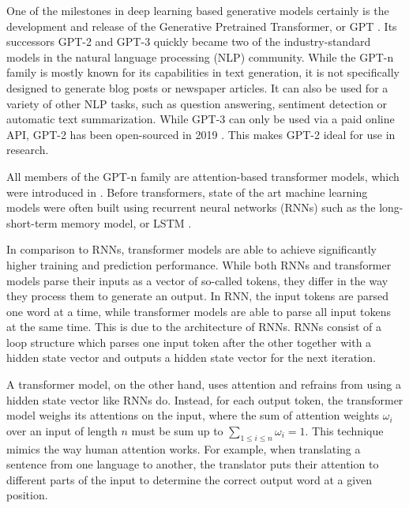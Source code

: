 One of the milestones in deep learning based generative models certainly is the development and release of the Generative Pretrained Transformer, or GPT \cite{OpenAI2018}.
Its successors GPT-2 \cite{OpenAI2019} and GPT-3 \cite{OpenAI2020} quickly became two of the industry-standard models in the natural language processing (NLP) community.
While the GPT-n family is mostly known for its capabilities in text generation, it is not specifically designed to generate blog posts or newspaper articles.
It can also be used for a variety of other NLP tasks, such as question answering, sentiment detection or automatic text summarization.
While GPT-3 can only be used via a paid online API, GPT-2 has been open-sourced in 2019 \cite{GPTReleasePlan2019}.
This makes GPT-2 ideal for use in research.

All members of the GPT-n family are attention-based transformer models, which were introduced in \cite{Vaswani2017}.
Before transformers, state of the art machine learning models were often built using recurrent neural networks (RNNs) such as the long-short-term memory model, or LSTM \cite{Hochreiter1997}.

In comparison to RNNs, transformer models are able to achieve significantly higher training and prediction performance.
While both RNNs and transformer models parse their inputs as a vector of so-called tokens, they differ in the way they process them to generate an output.
In RNN, the input tokens are parsed one word at a time, while transformer models are able to parse all input tokens at the same time.
This is due to the architecture of RNNs.
RNNs consist of a loop structure which parses one input token after the other together with a hidden state vector and outputs a hidden state vector for the next iteration.

A transformer model, on the other hand, uses attention and refrains from using a hidden state vector like RNNs do.
Instead, for each output token, the transformer model weighs its attentions on the input, where the sum of attention weights $\omega_i$ over an input of length $n$ must be sum up to $\sum_{1\leq i \leq n} \omega_i = 1$.
This technique mimics the way human attention works.
For example, when translating a sentence from one language to another, the translator puts their attention to different parts of the input to determine the correct output word at a given position.

